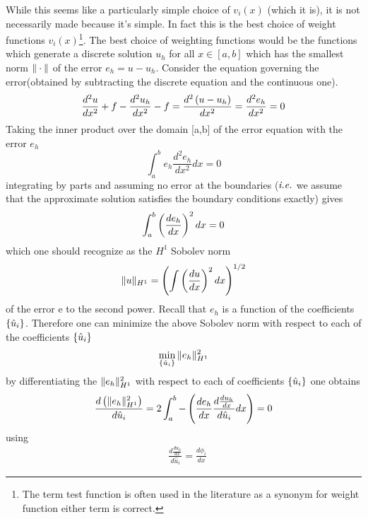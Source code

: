 While this seems like a particularly simple choice of $v_{i}(x)$ (which it is), it is not necessarily made because it's simple.  In fact this is the best choice of weight functions $v_{i}(x)$\footnote{The term test function is often used in the literature as a synonym for weight function either term is correct.}.  The best choice of weighting functions would be the functions which generate a discrete solution $u_{h}$ for all $x \in [a,b]$ which has the smallest norm $\Vert \cdot \Vert$ of the error $e_{h} = u - u_{h}$.
Consider the equation governing the error(obtained by subtracting the discrete equation and the continuous one). 
\begin{equation}\label{eq:c2_poissonerr}
\frac{d^{2} u }{dx^{2}} + f - \frac{d^{2} u_{h}}{dx^{2}} - f = \frac{d^{2} \left( u - u_{h} \right) }{dx^{2}} = \frac{d^{2} e_{h} }{dx^{2}} = 0 
\end{equation}
Taking the inner product over the domain [a,b] of the error equation  with the error $e_{h}$ 
\begin{equation}
\int_{a}^{b} e_{h}\frac{ d^{2}e_{h}}{ dx^{2}}  dx = 0 
\end{equation}
integrating by parts and assuming no error at the boundaries ($\emph{i.e.}$ we assume that the approximate solution satisfies the boundary conditions exactly) gives 
\begin{equation}
\int_{a}^{b} \left(  \frac{de_{h}}{dx}   \right)^{2} dx  = 0 
\end{equation}
which one should recognize as the $H^{1}$ Sobolev norm 
\begin{equation}
 \Vert u \Vert_{H^{1}} = \left(  \int \left(  \frac{du}{dx} \right)^{2} dx  \right)^{1/2}
\end{equation} 
 of the error e to the second power.  Recall that $e_{h}$ is a function of the coefficients $\left\{ \hat{u}_{i} \right\}$.  Therefore one can minimize the above Sobolev norm with respect to each of the coefficients $\left\{ \hat{u}_{i} \right\}$ 
 \begin{equation}
 \min_{\left\{ \hat{u}_{i} \right\}} \Vert e_{h} \Vert_{H^{1}}^{2}
 \end{equation}
by differentiating the  $\Vert e_{h} \Vert_{H^{1}}^{2}$ with respect to each of coefficients $\left\{ \hat{u}_{i} \right\}$
one obtains
\begin{equation}
\frac{ d\left(  \Vert e_{h} \Vert_{H^{1}}^{2}  \right) } {d \hat{u}_{i}} = 2 \int_{a}^{b}-\left( \frac{d e_{h} }{dx}  \frac{d \frac{d u_{h}}{dx} }{d \hat{u}_{i}} dx  \right) = 0
\end{equation}
using 
\begin{equation}
\begin{split}
& \frac{d \frac{ d u_{h}}{dx} } {d \hat{u}_{i} } =\frac{d \phi_{i}}{dx}
\end{split}
\end{equation}
